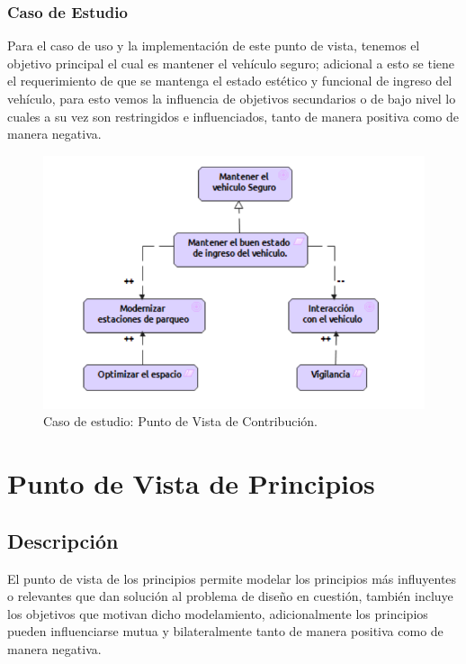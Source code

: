 \subsubsection{Caso de Estudio}
Para el caso de uso y la implementación de este punto de vista, tenemos el objetivo principal el cual es mantener el vehículo seguro; adicional a esto se tiene el requerimiento de que se mantenga el estado estético y funcional de ingreso del vehículo, para esto vemos la influencia de objetivos secundarios o de bajo nivel lo cuales a su vez son restringidos e influenciados, tanto de manera positiva como de manera negativa.

\begin{figure}[H]
	\centering
	\includegraphics[width=1.0\textwidth]{imagenes/Caso_Estudio/Motivacion/Contribucion.PDF}
	\caption{Caso de estudio: Punto de Vista de Contribución.}
	\label{fig:gap_analysis}
\end{figure}

\section{Punto de Vista de Principios}
\subsection{Descripción}
El punto de vista de los principios permite modelar los principios más  influyentes o relevantes que dan  solución al problema de diseño en cuestión, también incluye los objetivos que motivan dicho modelamiento, adicionalmente los principios pueden influenciarse mutua y bilateralmente tanto de manera positiva como de manera negativa.
